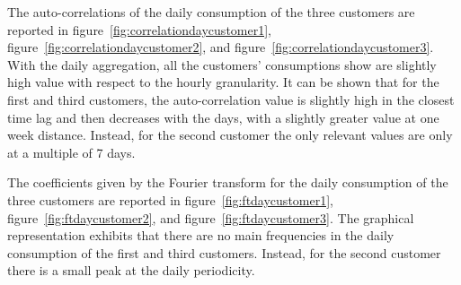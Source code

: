 The auto-correlations of the daily consumption of the three customers are reported in figure~\ref{fig:correlationdaycustomer1},  figure~\ref{fig:correlationdaycustomer2}, and  figure~\ref{fig:correlationdaycustomer3}.
With the daily aggregation, all the customers’ consumptions show are slightly high value with respect to the hourly granularity.
It can be shown that for the first and third customers, the auto-correlation value is slightly high in the closest time lag and then decreases with the days, with a slightly greater value at one week distance.
Instead, for the second customer the only relevant values are only at a multiple of 7 days.

The coefficients given by the Fourier transform for the daily consumption of the three customers are reported in figure~\ref{fig:ftdaycustomer1}, figure~\ref{fig:ftdaycustomer2}, and figure~\ref{fig:ftdaycustomer3}.
The graphical representation exhibits that there are no main frequencies in the daily consumption of the first and third customers.
Instead, for the second customer there is a small peak at the daily periodicity.

